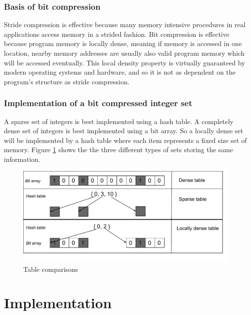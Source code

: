 \documentclass[12pt,twoside]{reedthesis}
\begin{document}
		\subsection{Basis of bit compression}
		
		Stride compression is effective because many memory intensive procedures in real applications access memory in a strided fashion. Bit compression is effective because program memory is locally dense, meaning if memory is accessed in one location, nearby memory addresses are usually also valid program memory which will be accessed eventually. This local density property is virtually guaranteed by modern operating systems and hardware, and so it is not as dependent on the program's structure as stride compression. 
		
		\subsection{Implementation of a bit compressed integer set}	
		
		
		
		A sparse set of integers is best implemented using a hash table. A completely dense set of integers is best implemented using a bit array. So a locally dense set will be implemented by a hash table where each item represents a fixed size set of memory. Figure \ref{fig:bit-local-density} shows the the three different types of sets storing the same information. %
		
		
		\begin{figure}[H]
			\caption{Table comparisons}
			\label{fig:bit-local-density}
			\includegraphics[scale=0.8]{BitSetComparison.pdf}
		\end{figure}
		
		
		
\chapter{Implementation}
\end{document}
